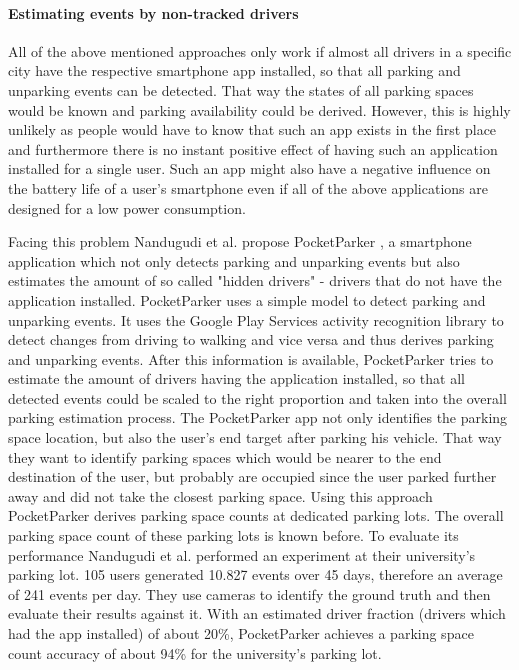 \paragraph{Estimating events by non-tracked drivers}

All of the above mentioned approaches only work if almost all drivers in a specific city have the respective smartphone app installed, so that all parking and unparking events can be detected. That way the states of all parking spaces would be known and parking availability could be derived. However, this is highly unlikely as people would have to know that such an app exists in the first place and furthermore there is no instant positive effect of having such an application installed for a single user. Such an app might also have a negative influence on the battery life of a user's smartphone even if all of the above applications are designed for a low power consumption.

Facing this problem Nandugudi et al. propose PocketParker \cite{Nandugudi:2014:PPP:2632048.2632098}, a smartphone application which not only detects parking and unparking events but also estimates the amount of so called "hidden drivers" - drivers that do not have the application installed. PocketParker uses a simple model to detect parking and unparking events. It uses the Google Play Services activity recognition library to detect changes from driving to walking and vice versa and thus derives parking and unparking events. After this information is available, PocketParker tries to estimate the amount of drivers having the application installed, so that all detected events could be scaled to the right proportion and taken into the overall parking estimation process. The PocketParker app not only identifies the parking space location, but also the user's end target after parking his vehicle. That way they want to identify parking spaces which would be nearer to the end destination of the user, but probably are occupied since the user parked further away and did not take the closest parking space. Using this approach PocketParker derives parking space counts at dedicated parking lots. The overall parking space count of these parking lots is known before. To evaluate its performance Nandugudi et al. performed an experiment at their university's parking lot. 105 users generated 10.827 events over 45 days, therefore an average of 241 events per day. They use cameras to identify the ground truth and then evaluate their results against it. With an estimated driver fraction (drivers which had the app installed) of about 20\%, PocketParker achieves a parking space count accuracy of about 94\% for the university's parking lot.


